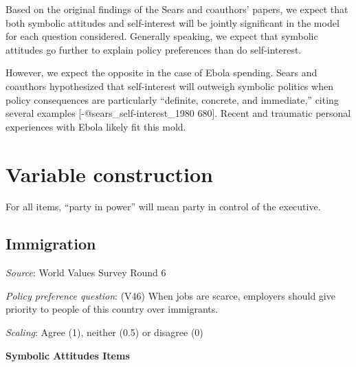 \documentclass[]{article}
\begin{document}
Based on the original findings of the Sears and coauthors' papers, we
expect that both symbolic attitudes and self-interest will be jointly
significant in the model for each question considered. Generally
speaking, we expect that symbolic attitudes go further to explain policy
preferences than do self-interest.

However, we expect the opposite in the case of Ebola spending. Sears and
coauthors hypothesized that self-interest will outweigh symbolic
politics when policy consequences are particularly ``definite, concrete,
and immediate,'' citing several examples {[}-@sears\_self-interest\_1980
680{]}. Recent and traumatic personal experiences with Ebola likely fit
this mold.

\section{Variable construction}\label{variable-construction}

For all items, ``party in power'' will mean party in control of the
executive.

\subsection{Immigration}\label{immigration}

\textit{Source}: World Values Survey Round 6

\textit{Policy preference question}: (V46) When jobs are scarce,
employers should give priority to people of this country over
immigrants.

\textit{Scaling}: Agree (1), neither (0.5) or disagree (0)

\textbf{Symbolic Attitudes Items}
\end{document}
